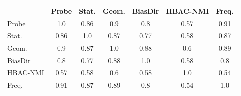 \begin{tabular}{lcccccc}
\toprule
 & Probe & Stat. & Geom. & BiasDir & HBAC-NMI & Freq. \\
\midrule
Probe & 1.0 & 0.86 & 0.9 & 0.8 & 0.57 & 0.91 \\
Stat. & 0.86 & 1.0 & 0.87 & 0.77 & 0.58 & 0.87 \\
Geom. & 0.9 & 0.87 & 1.0 & 0.88 & 0.6 & 0.89 \\
BiasDir & 0.8 & 0.77 & 0.88 & 1.0 & 0.58 & 0.8 \\
HBAC-NMI & 0.57 & 0.58 & 0.6 & 0.58 & 1.0 & 0.54 \\
Freq. & 0.91 & 0.87 & 0.89 & 0.8 & 0.54 & 1.0 \\
\bottomrule
\end{tabular}
